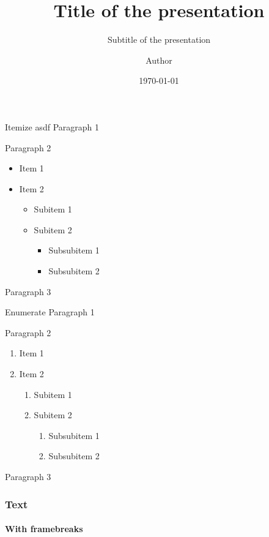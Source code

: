 \documentclass[aspectratio=169,onlytextwidth]{beamer}
\title{Title of the presentation}
\subtitle{Subtitle of the presentation}
\author{Author}
\date{\today}
\institute{Department of XYZ}
\begin{document}
\maketitle

\begin{frame} {Itemize} {asdf}
  Paragraph 1

  Paragraph 2

  \begin{itemize}
    \item Item 1
    \item Item 2
    \begin{itemize}
      \item Subitem 1
      \item Subitem 2
      \begin{itemize}
        \item Subsubitem 1
        \item Subsubitem 2
      \end{itemize}
    \end{itemize}
  \end{itemize}

  Paragraph 3
\end{frame}

\begin{frame}{Enumerate}
  Paragraph 1

  Paragraph 2

  \begin{enumerate}
    \item Item 1
    \item Item 2
    \begin{enumerate}
      \item Subitem 1
      \item Subitem 2
      \begin{enumerate}
        \item Subsubitem 1
        \item Subsubitem 2
      \end{enumerate}
    \end{enumerate}
  \end{enumerate}

  Paragraph 3
\end{frame}

\begin{frame}[allowframebreaks]
  \frametitle{Text}
  \framesubtitle{With framebreaks}
  \lipsum[1]

  \lipsum[2]
\end{frame}
\end{document}
